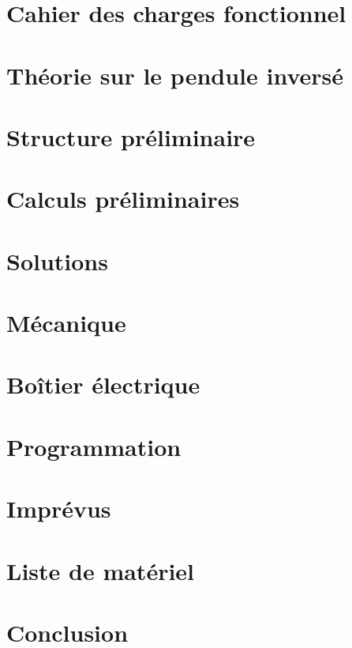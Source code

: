\documentclass[
    iai, %
    mi, %
]{heig-tb}
\begin{document}
\chapter{Cahier des charges fonctionnel}


\chapter{Théorie sur le pendule inversé}


\chapter{Structure préliminaire}


\chapter{Calculs préliminaires}


\chapter{Solutions}


\chapter{Mécanique}


\chapter{Boîtier électrique}


\chapter{Programmation}


\chapter{Imprévus}


\chapter{Liste de matériel}


\chapter{Conclusion}

\end{document}
